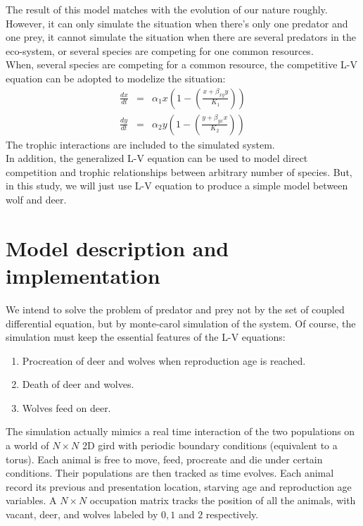 \documentclass[a4paper,12pt]{article}
\begin{document}
The result of this model matches with the evolution of our nature roughly. However, it can only simulate the situation when there's only one predator and one prey, it cannot simulate the situation when there are several predators in the eco-system, or several species are competing for one common resources. \\
When, several species are competing for a common resource, the competitive L-V equation can be adopted to modelize the situation:
\begin{eqnarray*}
\frac{dx}{dt} &=& \alpha_1 x (1- (\frac{x + \beta_{xy} y}{K_1})) \\
\frac{dy}{dt} &=& \alpha_2 y (1 - (\frac{y + \beta_{yx} x}{K_2}))
\end{eqnarray*}
The trophic interactions are included to the simulated system. \\
In addition, the generalized L-V equation can be used to model direct competition and trophic relationships between arbitrary number of species. But, in this study, we will just use L-V equation to produce a simple model between wolf and deer. \\

\section{Model description and implementation}
We intend to solve the problem of predator and prey not by the set of coupled differential equation, but by monte-carol simulation of the system. Of course, the simulation must keep the essential features of the L-V equations:
\begin{enumerate}
	\item Procreation of deer and wolves when reproduction age is reached.
	\item Death of deer and wolves.
	\item Wolves feed on deer.
\end{enumerate}

The simulation actually mimics a real time interaction of the two populations on a world of $N \times N$ 2D gird with periodic boundary conditions (equivalent to a torus). Each animal is free to move, feed, procreate and die under certain conditions. Their populations are then tracked as time evolves. Each animal record its previous and presentation location, starving age and reproduction age variables. A $N \times N$ occupation matrix tracks the position of all the animals, with vacant, deer, and wolves labeled by $0, 1$  and $2$ respectively. 
\end{document}
